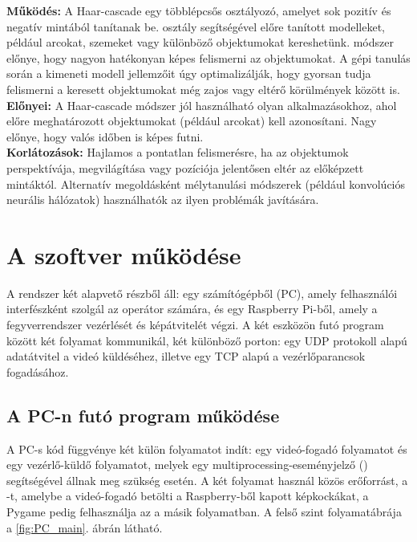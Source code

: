 \textbf{Működés:} A Haar-cascade egy többlépcsős osztályozó, amelyet sok pozitív és negatív mintából tanítanak be.  osztály segítségével előre tanított modelleket, például arcokat, szemeket vagy különböző objektumokat kereshetünk. módszer előnye, hogy nagyon hatékonyan képes felismerni az objektumokat. A gépi tanulás során a kimeneti modell jellemzőit úgy optimalizálják, hogy gyorsan tudja felismerni a keresett objektumokat még zajos vagy eltérő körülmények között is.\\

\textbf{Előnyei:} A Haar-cascade módszer jól használható olyan alkalmazásokhoz, ahol előre meghatározott objektumokat (például arcokat) kell azonosítani. Nagy előnye, hogy valós időben is képes futni.\\

\textbf{Korlátozások:} Hajlamos a pontatlan felismerésre, ha az objektumok perspektívája, megvilágítása vagy pozíciója jelentősen eltér az előképzett mintáktól. Alternatív megoldásként mélytanulási módszerek (például konvolúciós neurális hálózatok) használhatók az ilyen problémák javítására. 

\pagebreak

\section{A szoftver működése}
A rendszer két alapvető részből áll: egy számítógépből (PC), amely felhasználói interfészként szolgál az operátor számára, és egy Raspberry Pi-ből, amely a fegyverrendszer vezérlését és képátvitelét végzi. A két eszközön futó program között két folyamat kommunikál, két különböző porton: egy UDP protokoll alapú adatátvitel a videó küldéséhez, illetve egy TCP alapú a vezérlőparancsok fogadásához.\\


\subsection{A PC-n futó program működése}

A PC-s kód  függvénye két külön folyamatot indít: egy videó-fogadó folyamatot és egy vezérlő-küldő folyamatot, melyek egy multiprocessing-eseményjelző () segítségével állnak meg szükség esetén. A két folyamat használ közös erőforrást, a -t, amelybe a videó-fogadó betölti a Raspberry-ből kapott képkockákat, a Pygame pedig felhasználja az a másik folyamatban. A felső szint folyamatábrája a \ref{fig:PC_main}. ábrán látható. 

